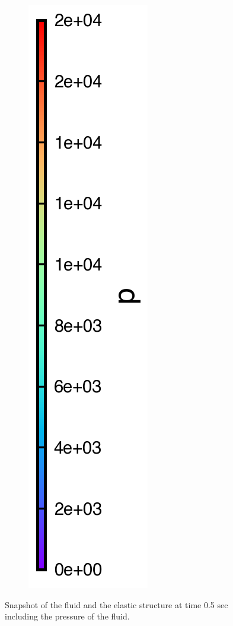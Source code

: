 \begin{figure}[!htpb]
\begin{subfigure}{0.48\textwidth}
  \end{subfigure}
  \begin{subfigure}{0.48\textwidth}
    \centering
    \includegraphics[scale=1.0]{figures/fsi/figures/ng_2020_hydrostatic_water_column_on_elastic_plate/colorbar_t_0}
  \end{subfigure}
  \caption{ Snapshot of the fluid and the elastic structure at time 0.5 sec
   including the pressure of the fluid.}
\label{fig:snapshot-hs-fsi}
\end{figure}

